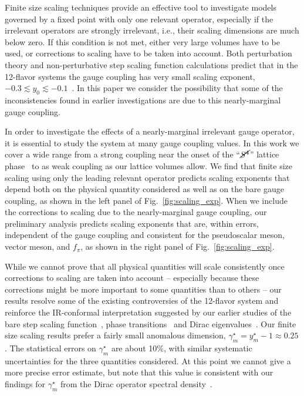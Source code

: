 \documentclass[aps,prl,twocolumn,]{revtex4}  %
\newcommand{\lsim}{\ensuremath{\lesssim} }
\newcommand{\Sb}{\ensuremath{\cancel{S^4}} }
\newcommand{\fig}[1]{Fig.~\ref{#1}}
\begin{document}
Finite size scaling techniques provide an effective tool to investigate models governed by a fixed point with only one relevant operator, especially if the irrelevant operators are strongly irrelevant, i.e., their scaling dimensions are much below zero.
If this condition is not met, either very large volumes have to be used, or corrections to scaling have to be taken into account.
Both perturbation theory and non-perturbative step scaling function calculations predict that in the 12-flavor systems the gauge coupling has very small scaling exponent, $-0.3 \lsim y_0 \lsim -0.1$~\cite{Ryttov:2010iz, Appelquist:2009ty}.
In this paper we consider the possibility that some of the inconsistencies found in earlier investigations are due to this nearly-marginal gauge coupling.

In order to investigate the effects of a nearly-marginal irrelevant gauge operator, it is essential to study the system at many gauge coupling values.
In this work we cover a wide range from a strong coupling near the onset of the ``$\Sb$'' lattice phase~\cite{Cheng:2011ic} to as weak coupling as our lattice volumes allow.
We find that finite size scaling using only the leading relevant operator predicts scaling exponents that depend both on the physical quantity considered as well as on the bare gauge coupling, as shown in the left panel of \fig{fig:scaling_exp}.
When we include the corrections to scaling due to the nearly-marginal gauge coupling, our preliminary analysis predicts scaling exponents that are, within errors, independent of the gauge coupling and consistent for the pseudoscalar meson, vector meson, and $f_\pi$, as shown in the right panel of \fig{fig:scaling_exp}.

While we cannot prove that all physical quantities will scale consistently once corrections to scaling are taken into account -- especially because these corrections might be more important to some quantities than to others -- our results resolve some of the existing controversies of the 12-flavor system and reinforce the IR-conformal interpretation suggested by our earlier studies of the bare step scaling function~\cite{Hasenfratz:2011xn}, phase transitions~\cite{Hasenfratz:2013uha} and Dirac eigenvalues~\cite{Cheng:2013eu}.
Our finite size scaling results prefer a fairly small anomalous dimension, $\gamma_m^{\star} = y_m^{\star} - 1 \approx 0.25$.
The statistical errors on $\gamma_m^{\star}$ are about 10\%, with similar systematic uncertainties for the three quantities considered.
At this point we cannot give a more precise error estimate, but note that this value is consistent with our findings for $\gamma_m^{\star}$ from the Dirac operator spectral density~\cite{Cheng:2013eu}.
\end{document}
